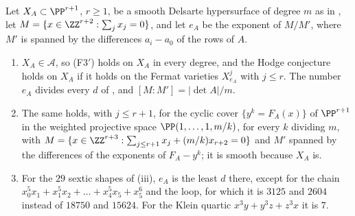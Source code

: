 \begin{corollary}
\label{cor:delsarteall}
Let $X_{A}\subset\PP^{r+1}$, $r\ge1$, be a smooth Delsarte hypersurface of
degree $m$ as in , let $M=\{x\in\ZZ^{r+2}:\sum_{j}x_{j}=0\}$,
and let $e_{A}$ be the exponent of $M/M'$, where $M'$ is spanned by the
differences $a_{i}-a_{0}$ of the rows of $A$.
\begin{enumerate}[label=\textup{(\roman*)},leftmargin=2.6em,itemsep=2pt]
\item $X_{A}\in\mathcal{A}$, so \textup{(F3$'$)} holds on $X_{A}$ in every
  degree, and the Hodge conjecture holds on $X_{A}$ if it holds on the Fermat
  varieties $X^{j}_{e_{A}}$ with $j\le r$. The number $e_{A}$ divides every
  $d$ of , and $[M:M']=|\det A|/m$.
\item The same holds, with $j\le r+1$, for the cyclic cover
  $\{y^{k}=F_{A}(x)\}$ of $\PP^{r+1}$ in the weighted projective space
  $\PP(1,\dots,1,m/k)$, for every $k$ dividing $m$, with
  $M=\{x\in\ZZ^{r+3}:\sum_{j\le r+1}x_{j}+(m/k)x_{r+2}=0\}$ and $M'$ spanned
  by the differences of the exponents of $F_{A}-y^{k}$; it is smooth
  because $X_{A}$ is.
\item For the $29$ sextic shapes of (iii), $e_{A}$ is the
  least $d$ there, except for the chain $x_{0}^{5}x_{1}+x_{1}^{5}x_{2}+\dots
  +x_{4}^{5}x_{5}+x_{5}^{6}$ and the loop, for which it is $3125$ and $2604$
  instead of $18750$ and $15624$. For the Klein quartic
  $x^{3}y+y^{3}z+z^{3}x$ it is $7$.
\end{enumerate}
\end{corollary}


